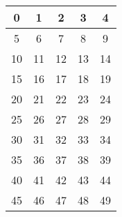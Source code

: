 \documentclass[a4paper, 10pt]{article}
\begin{document}
\begin{center}
\begin{tabular}{ |c|c|c|c|c|}
	\hline
	0 & 1 & 2 & 3 & 4\\
	\hline
	5 & 6 & 7 & 8 & 9\\
	\hline
	10 & 11 & 12 & 13 & 14\\
	\hline
	15 & 16 & 17 & 18 & 19\\
	\hline
	20 & 21 & 22 & 23 & 24\\
	\hline
	25 & 26 & 27 & 28 & 29\\
	\hline
	30 & 31 & 32 & 33 & 34\\
	\hline
	35 & 36 & 37 & 38 & 39\\
	\hline
	40 & 41 & 42 & 43 & 44\\
	\hline
	45 & 46 & 47 & 48 & 49\\
	\hline
\end{tabular}
\end{center}
\end{document}
